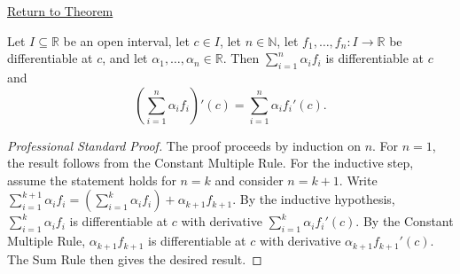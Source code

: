 \newpage
{}
\label{prf:finite-linear-combination}

\begin{remark*}[Return]
\hyperref[thm:finite-linear-combination-rule]{Return to Theorem}
\end{remark*}

\begin{theorem*}
Let $I \subseteq \mathbb{R}$ be an open interval, let $c \in I$, let $n \in \mathbb{N}$, let $f_1, \ldots, f_n : I \to \mathbb{R}$ be differentiable at $c$, and let $\alpha_1, \ldots, \alpha_n \in \mathbb{R}$. Then $\sum_{i=1}^{n} \alpha_i f_i$ is differentiable at $c$ and
\[
\left(\sum_{i=1}^{n} \alpha_i f_i\right)'(c) = \sum_{i=1}^{n} \alpha_i f_i'(c).
\]
\end{theorem*}

\begin{proof}[Professional Standard Proof]
\LRAProofBodyStart
The proof proceeds by induction on $n$. For $n = 1$, the result follows from the Constant Multiple Rule. For the inductive step, assume the statement holds for $n = k$ and consider $n = k+1$. Write $\sum_{i=1}^{k+1} \alpha_i f_i = \left(\sum_{i=1}^{k} \alpha_i f_i\right) + \alpha_{k+1} f_{k+1}$. By the inductive hypothesis, $\sum_{i=1}^{k} \alpha_i f_i$ is differentiable at $c$ with derivative $\sum_{i=1}^{k} \alpha_i f_i'(c)$. By the Constant Multiple Rule, $\alpha_{k+1} f_{k+1}$ is differentiable at $c$ with derivative $\alpha_{k+1} f_{k+1}'(c)$. The Sum Rule then gives the desired result.
\end{proof}


